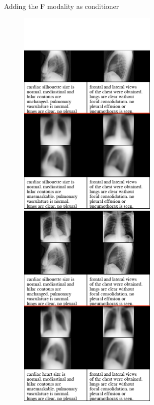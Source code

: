 \documentclass[aspectratio=169]{beamer}
\begin{document}
    \begin{frame}{Adding the F modality as conditioner}
        \begin{figure}
            \centering
            \includegraphics[width=0.6\textwidth, height = 0.75\textheight, keepaspectratio]{data/cond_gen/Lateral_text_small_edited.png}
            \includegraphics[width=0.6\textwidth, height = 0.75\textheight, keepaspectratio]{data/cond_gen/Lateral_PA_text_small_edited.png}
        \end{figure}
    \end{frame}
\end{document}
